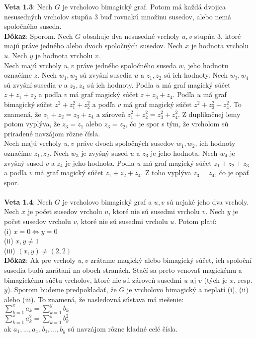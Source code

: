 \documentclass[12pt]{article}
\begin{document}
\textbf{Veta 1.3}: Nech $G$ je vrcholovo bimagický graf. Potom má každá dvojica nesusedných vrcholov stupňa 3 buď rovnakú množinu susedov, alebo nemá spoločného suseda.  \\

\textbf{Dôkaz}: Sporom. Nech $G$ obsahuje dva nesusedné vrcholy $u,v$ stupňa 3, ktoré majú práve jedného alebo dvoch spoločných susedov. Nech $x$ je hodnota vrcholu $u$. Nech $y$ je hodnota vrcholu $v$.  \\

Nech majú vrcholy $u,v$ práve jedného spoločného suseda $w$, jeho hodnotu označíme $z$. Nech $w_1, w_2$ sú zvyšní susedia $u$ a $z_1, z_2$ sú ich hodnoty. Nech $w_3, w_4$ sú zvyšní susedia $v$ a $z_3, z_4$ sú ich hodnoty. Podľa $u$ má graf magický súčet $z + z_1 + z_2$ a podľa $v$ má graf magický súčet $z + z_3 + z_4$. Podľa $u$ má graf bimagický súčet $z^2 + z^2_1 + z^2_2$ a podľa $v$ má graf magický súčet $z^2 + z^2_3 + z^2_4$. To znamená, že $z_1 + z_2 = z_3 + z_4$ a zároveň $z^2_1 + z^2_2 = z^2_3 + z^2_4$. Z duplikačnej lemy potom vyplýva, že $z_3 = z_1$ alebo $z_3 = z_2$, čo je spor s tým, že vrcholom sú priradené navzájom rôzne čísla. \\

Nech majú vrcholy $u,v$ práve dvoch spoločných susedov $w_1, w_2$, ich hodnoty označíme $z_1, z_2$. Nech $w_3$ je zvyšný sused $u$ a $z_3$ je jeho hodnota. Nech $w_4$ je zvyšný sused $v$ a $z_4$ je jeho hodnota. Podľa $u$ má graf magický súčet $z_1 + z_2 + z_3$ a podľa $v$ má graf magický súčet $z_1 + z_2 + z_4$. Z toho vyplýva $z_3 = z_4$, čo je opäť spor. \\\\

\textbf{Veta 1.4}: Nech $G$ je vrcholovo bimagický graf a $u,v$ sú nejaké jeho dva vrcholy. Nech $x$ je počet susedov vrcholu $u$, ktoré nie sú susedmi vrcholu $v$. Nech $y$ je počet susedov vrcholu $v$, ktoré nie sú susedmi vrcholu $u$. Potom platí: \\
(i) $x = 0 \iff y = 0$ \\
(ii) $x,y \neq 1$ \\
(iii) $(x,y) \neq (2,2)$ \\

\textbf{Dôkaz}: Ak pre vrcholy $u,v$ zrátame magický alebo bimagický súčet, ich spoloční susedia budú zarátaní na oboch stranách. Stačí sa preto venovať magickému a bimagickému súčtu vrcholov, ktoré nie sú zároveň susedmi $u$ aj $v$ (tých je $x$, resp. $y$). Sporom budeme predpokladať, že $G$ je vrcholovo bimagický a neplatí (i), (ii) alebo (iii). To znamená, že nasledovná sústava má riešenie: \\
$\sum_{k=1}^{x} a_k = \sum_{k=1}^{y} b_k$ \\
$\sum_{k=1}^{x} a^2_k = \sum_{k=1}^{y} b^2_k$ \\
ak $a_1, ... , a_x, b_1, ... , b_y$ sú navzájom rôzne kladné celé čísla. \\
\end{document}
